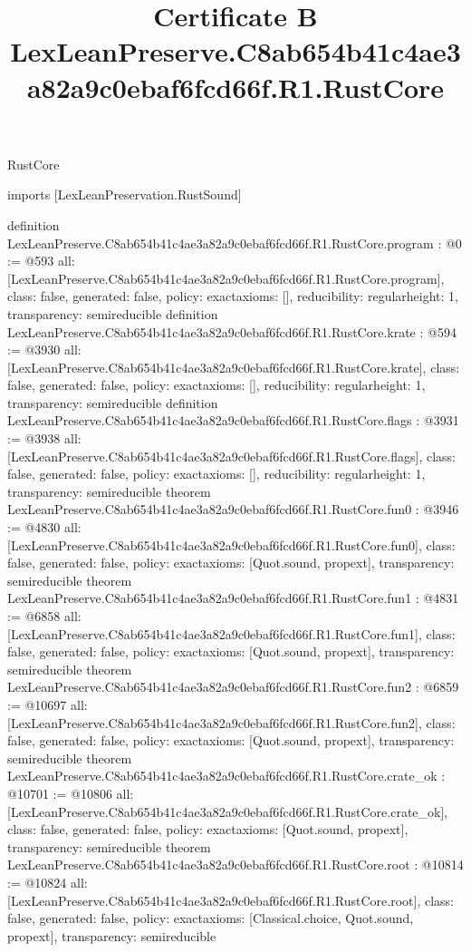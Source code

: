 \begin{lexlean}{RustCore}
\title{Certificate B LexLeanPreserve.C8ab654b41c4ae3a82a9c0ebaf6fcd66f.R1.RustCore}
\begin{coremodule}
imports [LexLeanPreservation.RustSound]

definition LexLeanPreserve.C8ab654b41c4ae3a82a9c0ebaf6fcd66f.R1.RustCore.program : @0 := @593 {
  all: [LexLeanPreserve.C8ab654b41c4ae3a82a9c0ebaf6fcd66f.R1.RustCore.program],
  class: false,
  generated: false,
  policy: exact{axioms: []},
  reducibility: regular{height: 1},
  transparency: semireducible
}
definition LexLeanPreserve.C8ab654b41c4ae3a82a9c0ebaf6fcd66f.R1.RustCore.krate : @594 := @3930 {
  all: [LexLeanPreserve.C8ab654b41c4ae3a82a9c0ebaf6fcd66f.R1.RustCore.krate],
  class: false,
  generated: false,
  policy: exact{axioms: []},
  reducibility: regular{height: 1},
  transparency: semireducible
}
definition LexLeanPreserve.C8ab654b41c4ae3a82a9c0ebaf6fcd66f.R1.RustCore.flags : @3931 := @3938 {
  all: [LexLeanPreserve.C8ab654b41c4ae3a82a9c0ebaf6fcd66f.R1.RustCore.flags],
  class: false,
  generated: false,
  policy: exact{axioms: []},
  reducibility: regular{height: 1},
  transparency: semireducible
}
theorem LexLeanPreserve.C8ab654b41c4ae3a82a9c0ebaf6fcd66f.R1.RustCore.fun0 : @3946 := @4830 {
  all: [LexLeanPreserve.C8ab654b41c4ae3a82a9c0ebaf6fcd66f.R1.RustCore.fun0],
  class: false,
  generated: false,
  policy: exact{axioms: [Quot.sound, propext]},
  transparency: semireducible
}
theorem LexLeanPreserve.C8ab654b41c4ae3a82a9c0ebaf6fcd66f.R1.RustCore.fun1 : @4831 := @6858 {
  all: [LexLeanPreserve.C8ab654b41c4ae3a82a9c0ebaf6fcd66f.R1.RustCore.fun1],
  class: false,
  generated: false,
  policy: exact{axioms: [Quot.sound, propext]},
  transparency: semireducible
}
theorem LexLeanPreserve.C8ab654b41c4ae3a82a9c0ebaf6fcd66f.R1.RustCore.fun2 : @6859 := @10697 {
  all: [LexLeanPreserve.C8ab654b41c4ae3a82a9c0ebaf6fcd66f.R1.RustCore.fun2],
  class: false,
  generated: false,
  policy: exact{axioms: [Quot.sound, propext]},
  transparency: semireducible
}
theorem LexLeanPreserve.C8ab654b41c4ae3a82a9c0ebaf6fcd66f.R1.RustCore.crate_ok : @10701 := @10806 {
  all: [LexLeanPreserve.C8ab654b41c4ae3a82a9c0ebaf6fcd66f.R1.RustCore.crate_ok],
  class: false,
  generated: false,
  policy: exact{axioms: [Quot.sound, propext]},
  transparency: semireducible
}
theorem LexLeanPreserve.C8ab654b41c4ae3a82a9c0ebaf6fcd66f.R1.RustCore.root : @10814 := @10824 {
  all: [LexLeanPreserve.C8ab654b41c4ae3a82a9c0ebaf6fcd66f.R1.RustCore.root],
  class: false,
  generated: false,
  policy: exact{axioms: [Classical.choice, Quot.sound, propext]},
  transparency: semireducible
}


\end{coremodule}
\end{lexlean}
